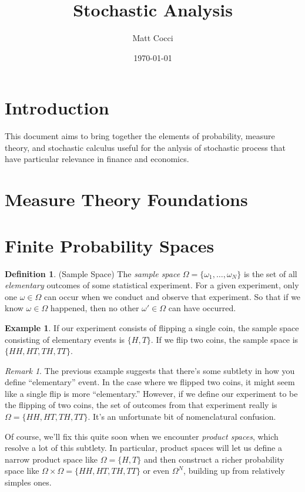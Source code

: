 \documentclass[a4paper,12pt]{article}
\author{Matt Cocci}
\title{Stochastic Analysis}
\date{\today}
\theoremstyle{plain}
\theoremstyle{definition}
\newtheorem{defn}[thm]{Definition}
\newtheorem{ex}[thm]{Example}
\theoremstyle{remark}
\newtheorem*{rmk}{Remark}
\begin{document}
\maketitle
\tableofcontents

\clearpage

\section{Introduction}

This document aims to bring together the elements of probability,
measure theory, and stochastic calculus useful for the anlysis of
stochastic process that have particular relevance in finance and
economics.

\section{Measure Theory Foundations}


\section{Finite Probability Spaces}

\begin{defn}{(Sample Space)}
The \emph{sample space} $\Omega=\{\omega_1,\ldots,\omega_N\}$ is the set
of all \emph{elementary} outcomes of some statistical experiment. For a
given experiment, only one $\omega \in \Omega$ can occur when we conduct
and observe that experiment.  So that if we know $\omega \in \Omega$
happened, then no other $\omega' \in \Omega$ can have occurred.
\end{defn}
\begin{ex}
If our experiment consists of flipping a single coin, the sample space
consisting of elementary events is $\{H,T\}$. If we flip two coins, the
sample space is $\{HH,HT,TH,TT\}$.
\end{ex}
\begin{rmk}
The previous example suggests that there's some subtlety in how you
define ``elementary'' event. In the case where we flipped two coins, it
might seem like a single flip is more ``elementary.'' However, if we define
our experiment to be the flipping of two coins, the set of outcomes from
that experiment really is $\Omega=\{HH,HT,TH,TT\}$. It's an unfortunate
bit of nomenclatural confusion.

Of course, we'll fix this quite soon when we encounter \emph{product
spaces}, which resolve a lot of this subtlety. In particular, product
spaces will let us define a narrow product space like $\Omega=\{H,T\}$
and then construct a richer probability space like $\Omega\times \Omega
= \{HH,HT,TH,TT\}$ or even $\Omega^N$, building up from relatively
simples ones.
\end{rmk}
\end{document}
